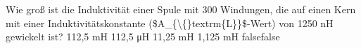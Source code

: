     {Wie groß ist die Induktivität einer Spule mit 300 Windungen, die auf einen Kern mit einer Induktivitätskonstante (\$A\_\{\textbackslash\{\}textrm\{L\}\}\$-Wert) von 1250 nH gewickelt ist?}
    {112,5 mH}
    {112,5 μH}
    {11,25 mH}
    {1,125 mH}
    {false}{false}